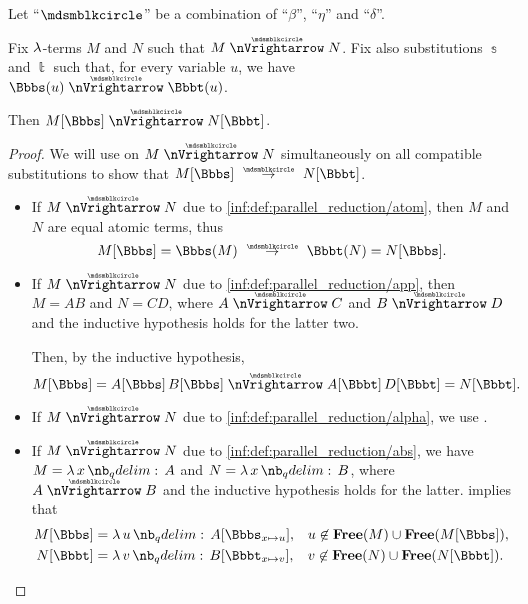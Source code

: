 \begin{proposition}\label{thm:substitution_on_parallel_reduction}
  Let \enquote{\( {\Anon} \)} be a combination of \enquote{\( \beta \)}, \enquote{\( \eta \)} and \enquote{\( \delta \)}.

  Fix \( \mathrm{\lambda} \)-terms \( M \) and \( N \) such that \( M \ppred N \). Fix also substitutions \( \Bbbs \) and \( \Bbbt \) such that, for every variable \( u \), we have \( \Bbbs(u) \ppred \Bbbt(u) \).

  Then \( M[\Bbbs] \ppred N[\Bbbt] \).
\end{proposition}
\begin{proof}
  We will use  on \( M \ppred N \) simultaneously on all compatible substitutions to show that \( M[\Bbbs] \pred N[\Bbbt] \).
  \begin{itemize}
    \item If \( M \ppred N \) due to \ref{inf:def:parallel_reduction/atom}, then \( M \) and \( N \) are equal atomic terms, thus
    \begin{equation*}
      M[\Bbbs] = \Bbbs(M) \pred \Bbbt(N) = N[\Bbbs].
    \end{equation*}

    \item If \( M \ppred N \) due to \ref{inf:def:parallel_reduction/app}, then \( M = AB \) and \( N = CD \), where \( A \ppred C \) and \( B \ppred D \) and the inductive hypothesis holds for the latter two.

    Then, by the inductive hypothesis,
    \begin{equation*}
      M[\Bbbs]
      =
      A[\Bbbs] \thinspace B[\Bbbs]
      \ppred
      A[\Bbbt] \thinspace D[\Bbbt]
      =
      N[\Bbbt].
    \end{equation*}

    \item If \( M \ppred N \) due to \ref{inf:def:parallel_reduction/alpha}, we use .

    \item If \( M \ppred N \) due to \ref{inf:def:parallel_reduction/abs}, we have \( M = \qabs x A \) and \( N = \qabs x B \), where \( A \ppred B \) and the inductive hypothesis holds for the latter.  implies that
    \begin{align*}
      M[\Bbbs] &= \qabs u A[\Bbbs_{x \mapsto u}], &&u \not\in \op*{Free}(M) \cup \op*{Free}(M[\Bbbs]), \\
      N[\Bbbt]   &= \qabs v B[\Bbbt_{x \mapsto v}],   &&v \not\in \op*{Free}(N) \cup \op*{Free}(N[\Bbbt]).
    \end{align*}


\end{itemize}
\end{proof}
